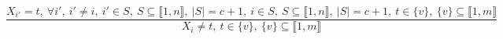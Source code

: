 $$\frac{X_{i'}=t,~\forall i',~i' \neq i,~i' \in S,~S \subseteq \llbracket1,n\rrbracket,~|S|=c+1,~i \in S,~S \subseteq \llbracket1,n\rrbracket,~|S|=c+1,~t \in \{v\},~\{v\} \subseteq \llbracket1,m\rrbracket}{X_{i} \neq t,~t \in \{v\},~\{v\} \subseteq \llbracket1,m\rrbracket}$$ 
